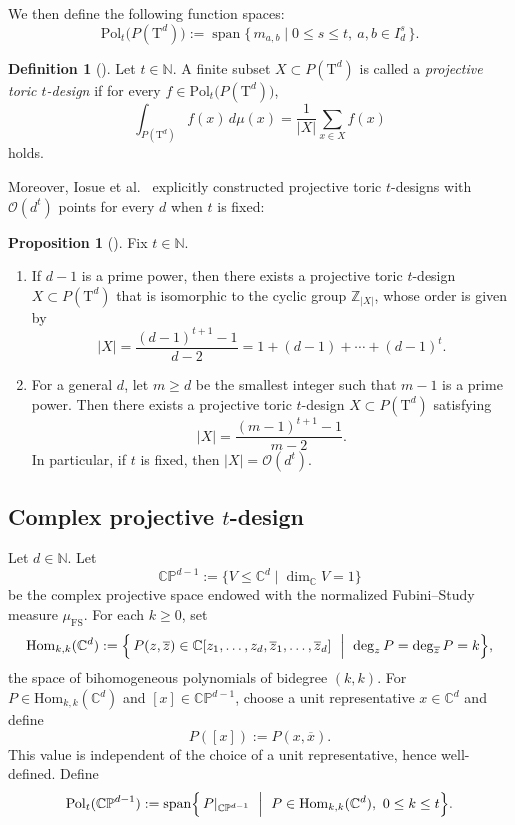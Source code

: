 \documentclass{amsart}
\theoremstyle{definition}
\newtheorem{proposition}[theorem]{Proposition}
\newtheorem{definition}[theorem]{Definition}
\theoremstyle{remark}
\numberwithin{equation}{section}
\newcommand{\T}{{\mathrm T}}
\newcommand{\Z}{{\mathbb Z}}
\newcommand{\N}{{\mathbb N}}
\newcommand{\C}{{\mathbb C}}
\newcommand{\CP}{\mathbb{CP}}
\newcommand{\Pol}{\mathrm{Pol}}
\newcommand{\Hom}{\mathrm{Hom}}
\newcommand{\order}{\mathcal{O}}
\begin{document}
We then define the following function spaces:
\[
\Pol_t\bigl(P(\T^d)\bigr)
:=\operatorname{span}\{\,m_{a,b}\mid 0\le s\le t,\ a,b\in I_d^s\,\}.
\]

\begin{definition}[{\cite[Def.~2.5]{IMAEG2024}}]
\label{def:projective_toric_design}
Let $t\in\N$.
A finite subset $X\subset P(\T^d)$ is called a \emph{projective toric $t$-design}
if for every $f\in\Pol_t\bigl(P(\T^d)\bigr)$,
\[
\int_{P(\T^d)} f(x)\,d\mu(x)
=
\frac{1}{|X|}\sum_{x\in X} f(x)
\]
holds.
\end{definition}


Moreover, Iosue et al.~\cite{IMAEG2024} explicitly constructed projective toric $t$-designs with $\order(d^t)$ points for every $d$ when $t$ is fixed:

\begin{proposition}[{\cite[Sec.~3.1]{IMAEG2024}}]\label{prop:IMAEG-poly-size}
Fix $t\in\N$.
\begin{enumerate}
\item
If $d-1$ is a prime power, then there exists a projective toric $t$-design
$X\subset P(\mathrm{T}^d)$ that is isomorphic to the cyclic group $\Z_{|X|}$, whose order is given by
\[
|X|=\frac{(d-1)^{t+1}-1}{d-2}
=1+(d-1)+\cdots+(d-1)^t.
\]
\item
For a general $d$, let $m\ge d$ be the smallest integer such that $m-1$ is a prime power.
Then there exists a projective toric $t$-design $X\subset P(\mathrm{T}^d)$ satisfying
\[
|X|=\frac{(m-1)^{t+1}-1}{m-2}.
\]
In particular, if $t$ is fixed, then $|X|=\order(d^t)$.
\end{enumerate}
\end{proposition}

\subsection{Complex projective $t$-design}
Let $d\in\N$.
Let
\[
\CP^{d-1}:=\{V\le\C^d\mid \dim_{\C} V=1\}
\]
be the complex projective space endowed with the normalized Fubini--Study measure $\mu_{\mathrm{FS}}$.
For each $k\ge0$, set
\[
\Hom_{k,k}(\C^d)
:=
\Bigl\{\,P(z,\overline z)\in
\C[z_1,\dots,z_d,\overline z_1,\dots,\overline z_d]
\ \Bigm|\ 
\deg_z P=\deg_{\overline z}P=k
\Bigr\},
\]
the space of bihomogeneous polynomials of bidegree $(k,k)$.
For $P\in\Hom_{k,k}(\C^d)$ and $[x]\in\CP^{d-1}$, choose a unit representative $x\in\C^d$ and define
\[
P([x]) := P(x,\overline x).
\]
This value is independent of the choice of a unit representative, hence well-defined.
Define
\[
\Pol_t(\CP^{d-1})
:=
\operatorname{span}\Bigl\{\,P|_{\CP^{d-1}}\ \Bigm|\ 
P\in\Hom_{k,k}(\C^d),\ 0\le k\le t
\Bigr\}.
\]
\end{document}
